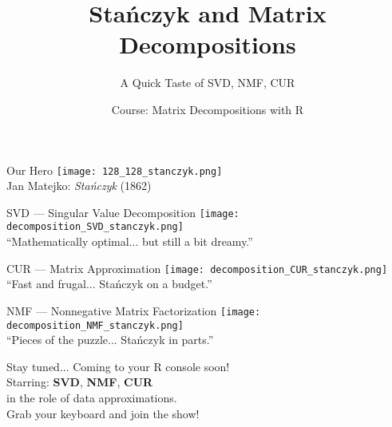 \documentclass{beamer}
\title{Stańczyk and Matrix Decompositions}
\subtitle{A Quick Taste of SVD, NMF, CUR}
\author{Course: Matrix Decompositions with R}
\date{}
\begin{document}
\begin{frame}
  \titlepage
\end{frame}

\begin{frame}{Our Hero}
  \centering
  \texttt{[image: 128\_128\_stanczyk.png]}\\[1ex]
  \Large Jan Matejko: \emph{Stańczyk} (1862)
\end{frame}

\begin{frame}{SVD — Singular Value Decomposition}
  \centering
  \texttt{[image: decomposition\_SVD\_stanczyk.png]}\\[1ex]
  \Large ``Mathematically optimal... but still a bit dreamy.''
\end{frame}

\begin{frame}{CUR — Matrix Approximation}
  \centering
  \texttt{[image: decomposition\_CUR\_stanczyk.png]}\\[1ex]
  \Large ``Fast and frugal... Stańczyk on a budget.''
\end{frame}

\begin{frame}{NMF — Nonnegative Matrix Factorization}
  \centering
  \texttt{[image: decomposition\_NMF\_stanczyk.png]}\\[1ex]
  \Large ``Pieces of the puzzle... Stańczyk in parts.''
\end{frame}

\begin{frame}{Stay tuned...}
  \centering
  \Large Coming to your R console soon! \\
  \Large Starring: \textbf{SVD}, \textbf{NMF}, \textbf{CUR} \\
  \Large in the role of data approximations. \\
  \Large Grab your keyboard and join the show!
\end{frame}
\end{document}
